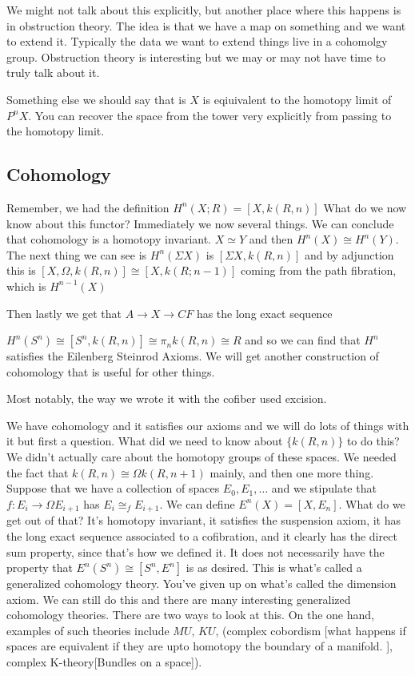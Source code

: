 \documentclass[10pt]{article}
\theoremstyle{definition}
\begin{document}
	We might not talk about this explicitly, but another place where this happens is in obstruction theory. The idea is that we have a map on something and we want to extend it. Typically the data we want to extend things live in a cohomolgy group. Obstruction theory is interesting but we may or may not have time to truly talk about it. 
	
	Something else we should say that is $X$ is eqiuivalent to the homotopy limit of $P^nX$. You can recover the space from the tower very explicitly from passing to the homotopy limit.
	\subsection{Cohomology}
	Remember, we had the definition	$H^n(X;R)=[X,k(R,n)]$ What do we now know about this functor? Immediately we now several things. We can conclude that cohomology is a homotopy invariant. $X\simeq Y$ and then $H^n(X)\cong H^n(Y)$. The next thing we can see is $H^n(\Sigma X)$ is $[\Sigma X,k(R,n)] $ and by adjunction this is $[X,\Omega, k(R,n)]\cong [X,k(R;n-1)]$ coming from the path fibration, which is $H^{n-1}(X)$
	
	Then lastly we get that $A\to X\to CF$ has the long exact sequence \begin{center}
	\end{center}
	
	$H^n(S^n)\cong [S^n,k(R,n)]\cong \pi_n k(R,n)\cong R$ and so we can find that $H^n$ satisfies the Eilenberg Steinrod Axioms. We will get another construction of cohomology that is useful for other things.
	
	Most notably, the way we wrote it with the cofiber used excision. 
	
	We have cohomology and it satisfies our axioms and we will do lots of things with it but first a question. What did we need to know about $\{k(R,n)\}$ to do this? We didn't actually care about the homotopy groups of these spaces. We needed the fact that $k(R,n)\cong \Omega k(R,n+1)$ mainly, and then one more thing. Suppose that we have a collection of spaces  $E_0, E_1,\dots $ and we stipulate that $f:E_i\to \Omega E_{i+1}$ has $E_i\cong_f E_{i+1}$. We can define $E^n(X)=[X,E_n]$. What do we get out of that? It's homotopy invariant, it satisfies the suspension axiom, it has the long exact sequence associated to a cofibration, and it clearly has the direct sum property, since that's how we defined it. It does not necessarily have the property that $E^n(S^n)\cong [S^n, E^n]$ is as desired. This is what's called a generalized cohomology theory. You've given up on what's called the dimension axiom. We can still do this and there are many interesting generalized cohomology theories. There are two ways to look at this. On the one hand, examples of such theories include $MU$, $KU$, (complex cobordism [what happens if spaces are equivalent if they are upto homotopy the boundary of a manifold. ], complex K-theory[Bundles on a space]). 
	
\end{document}
